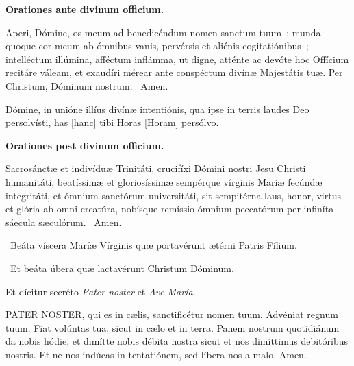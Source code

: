 ﻿%
\mylessonsize
\begin{multicols}{2}%
{
\begin{center}{%
\label{orationes}
\textbf{Orationes ante divinum officium.}
}\end{center}

	Aperi, Dómine, os meum ad benedicéndum nomen sanctum
tuum~: munda quoque cor meum ab ómnibus vanis, pervérsis et aliénis
cogitatiónibus~; intelléctum illúmina, afféctum inflámma, ut digne, atténte
ac devóte hoc Offícium recitáre váleam, et exaudíri mérear ante
conspéctum divínæ Majestátis tuæ. Per Christum, Dóminum nostrum.
\hfill{}
\Rbar{}~Amen.\null
}

{
Dómine, in unióne illíus divínæ intentiónis, qua ipse in terris
laudes Deo persolvísti, has [hanc] tibi Horas [Horam] persólvo.
}


\mylessonsize
{
\begin{center}{%
\textbf{Orationes post divinum officium.}
}\end{center}

	Sacrosánctæ et indivíduæ Trinitáti, crucifíxi Dómini nostri Jesu
Christi humanitáti, beatíssimæ et gloriosíssimæ sempérque vírginis Maríæ
fecúndæ integritáti, et ómnium sanctórum universitáti, sit sempitérna laus,
honor, virtus et glória ab omni creatúra, nobísque remíssio ómnium
peccatórum per infiníta sáecula sæculórum.
\hfill{}
\Rbar{}~Amen.\null
}


{
\Vbar{}~Beáta víscera Maríæ Vírginis quæ portavérunt ætérni Patris Fílium.

\Rbar{}~Et beáta úbera quæ lactavérunt Christum Dóminum.


Et dícitur secréto \emph{Pater noster} et \emph{Ave María}.

{PATER NOSTER, qui es in cælis, sanctificétur nomen tuum. Advéniat regnum tuum. Fiat volúntas tua, sicut in cælo et in terra. Panem nostrum quotidiánum da nobis hódie, et dimítte nobis débita nostra sicut et nos dimíttimus debitóribus nostris. Et ne nos indúcas in tentatiónem, sed líbera nos a malo. Amen.

}}
\end{multicols}
